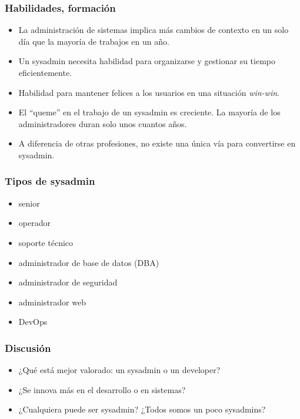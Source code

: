 \documentclass{beamer}
\begin{document}
\begin{frame}
\frametitle{Habilidades, formación}

\begin{itemize}
\item La administración de sistemas implica más cambios de contexto en un solo día que la mayoría de trabajos en un año.
\item Un sysadmin necesita habilidad para organizarse y gestionar su tiempo eficientemente.
\item Habilidad para mantener felices a los usuarios en una situación \textit{win-win}.
\item El ``queme'' en el trabajo de un sysadmin es creciente. La mayoría de los administradores duran solo unos cuantos años.
\item A diferencia de otras profesiones, no existe una única vía para convertirse en sysadmin.
\end{itemize}
\end{frame}


\begin{frame}
\frametitle{Tipos de sysadmin}

\begin{itemize}
\item senior
\item operador
\item soporte técnico 
\item administrador de base de datos (DBA)
\item administrador de seguridad
\item administrador web
\item DevOps
\end{itemize}
\end{frame}


\begin{frame}
\frametitle{Discusión}

\begin{itemize}
\item ¿Qué está mejor valorado: un sysadmin o un developer?
\item ¿Se innova más en el desarrollo o en sistemas?
\item ¿Cualquiera puede ser sysadmin? ¿Todos somos un poco sysadmins?
\end{itemize}
\end{frame}
\end{document}
